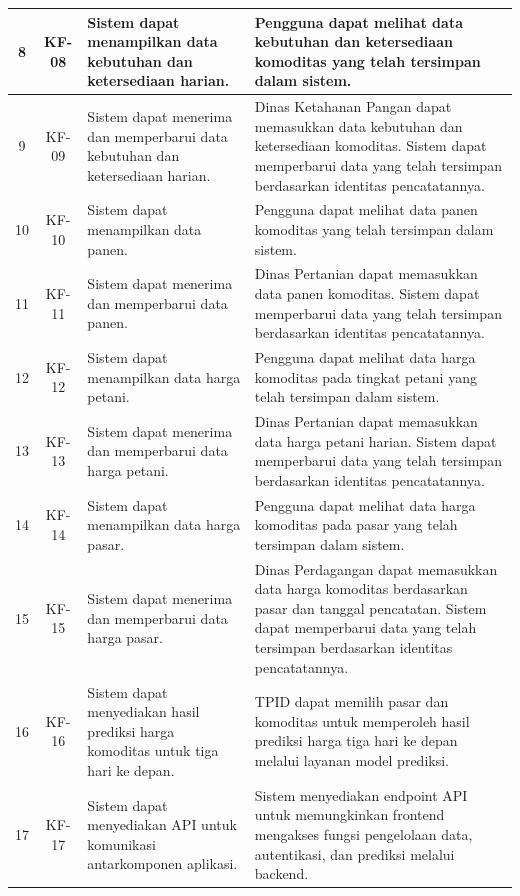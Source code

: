 \begin{longtable}{|c|c|p{3.7cm}|p{7.3cm}|}
    8 & KF-08 &
    Sistem dapat menampilkan data kebutuhan dan ketersediaan harian. &
    Pengguna dapat melihat data kebutuhan dan ketersediaan komoditas yang telah tersimpan dalam sistem. \\ \hline

    9 & KF-09 &
    Sistem dapat menerima dan memperbarui data kebutuhan dan ketersediaan harian. &
    Dinas Ketahanan Pangan dapat memasukkan data kebutuhan dan ketersediaan komoditas. Sistem dapat memperbarui data yang telah tersimpan berdasarkan identitas pencatatannya. \\ \hline

    10 & KF-10 &
    Sistem dapat menampilkan data panen. &
    Pengguna dapat melihat data panen komoditas yang telah tersimpan dalam sistem. \\ \hline

    11 & KF-11 &
    Sistem dapat menerima dan memperbarui data panen. &
    Dinas Pertanian dapat memasukkan data panen komoditas. Sistem dapat memperbarui data yang telah tersimpan berdasarkan identitas pencatatannya. \\ \hline

    12 & KF-12 &
    Sistem dapat menampilkan data harga petani. &
    Pengguna dapat melihat data harga komoditas pada tingkat petani yang telah tersimpan dalam sistem. \\ \hline

    13 & KF-13 &
    Sistem dapat menerima dan memperbarui data harga petani. &
    Dinas Pertanian dapat memasukkan data harga petani harian. Sistem dapat memperbarui data yang telah tersimpan berdasarkan identitas pencatatannya. \\ \hline

    14 & KF-14 &
    Sistem dapat menampilkan data harga pasar. &
    Pengguna dapat melihat data harga komoditas pada pasar yang telah tersimpan dalam sistem. \\ \hline

    15 & KF-15 &
    Sistem dapat menerima dan memperbarui data harga pasar. &
    Dinas Perdagangan dapat memasukkan data harga komoditas berdasarkan pasar dan tanggal pencatatan. Sistem dapat memperbarui data yang telah tersimpan berdasarkan identitas pencatatannya. \\ \hline

    16 & KF-16 &
    Sistem dapat menyediakan hasil prediksi harga komoditas untuk tiga hari ke depan. &
    TPID dapat memilih pasar dan komoditas untuk memperoleh hasil prediksi harga tiga hari ke depan melalui layanan model prediksi. \\ \hline

    17 & KF-17 &
    Sistem dapat menyediakan API untuk komunikasi antarkomponen aplikasi. &
    Sistem menyediakan endpoint API untuk memungkinkan frontend mengakses fungsi pengelolaan data, autentikasi, dan prediksi melalui backend. \\ \hline

\end{longtable}

